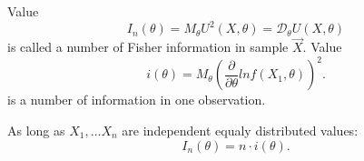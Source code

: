 \begin{definition}
    Value \[
    I_n (\theta) = M_{\theta} U^2(X, \theta) = \mathcal{D}_{\theta} U(X, \theta)
    \] is called a number of Fisher information in sample $\vec{X}$.
    Value
    \[
    i(\theta) = M_{\theta} \left( \frac{\partial }{\partial \theta} ln f(X_1, \theta) \right) ^2
    .\] is a number of information in one observation.
\end{definition}

As long as $X_1, \ldots X_n $ are independent equaly distributed values:
\[
I_n(\theta) = n \cdot i(\theta)
.\] 
